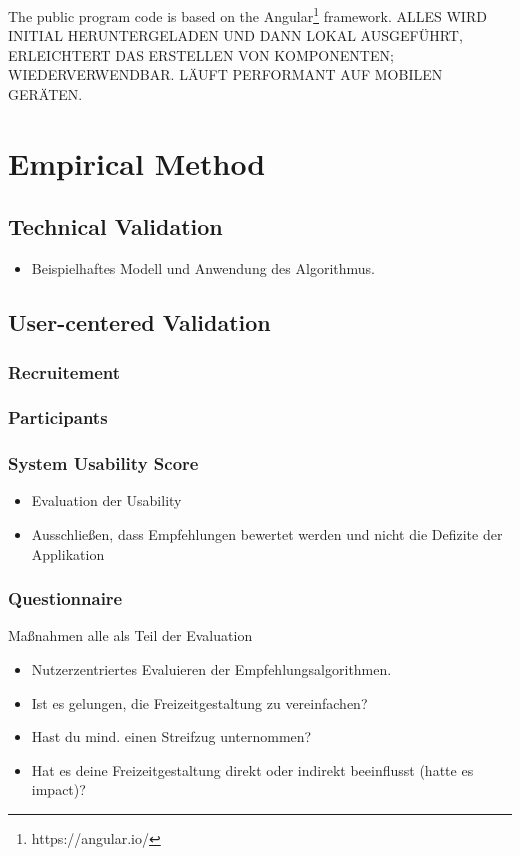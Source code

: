 \documentclass[12pt,numbers=noenddot,parskip,bibliography=totocnumbered,listof=totocnumbered]{scrreprt}
\begin{document}
The public program code is based on the Angular\footnote{https://angular.io/} framework.
ALLES WIRD INITIAL HERUNTERGELADEN UND DANN LOKAL AUSGEFÜHRT, ERLEICHTERT DAS ERSTELLEN VON KOMPONENTEN; WIEDERVERWENDBAR. LÄUFT PERFORMANT AUF MOBILEN GERÄTEN.

\chapter{Empirical Method}

\section{Technical Validation}
\begin{itemize} 
	\item Beispielhaftes Modell und Anwendung des Algorithmus.
\end{itemize} 

\section{User-centered Validation}

\subsection{Recruitement}

\subsection{Participants}

\subsection{System Usability Score}
\begin{itemize} 
	\item Evaluation der Usability
	\item Ausschließen, dass Empfehlungen bewertet werden und nicht die Defizite der Applikation
\end{itemize} 

\subsection{Questionnaire}
Maßnahmen alle als Teil der Evaluation
\begin{itemize} 
	\item Nutzerzentriertes Evaluieren der Empfehlungsalgorithmen.
	\item Ist es gelungen, die Freizeitgestaltung zu vereinfachen?
	\item Hast du mind. einen Streifzug unternommen?
	\item Hat es deine Freizeitgestaltung direkt oder indirekt beeinflusst (hatte es impact)?
\end{itemize} 
\end{document}
